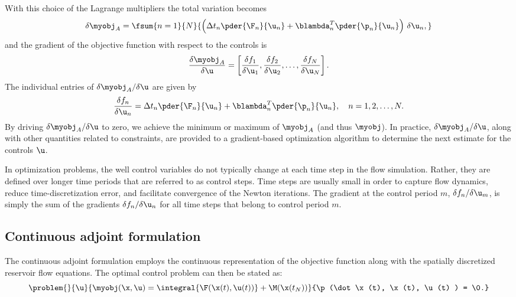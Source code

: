 %
With this choice of the Lagrange multipliers the total variation becomes
\begin{align*}
  \delta \myobj_A =
    \fsum{n=1}{N}{
      \left (
        \Delta t_n \pder{\F_n}{\u_n}
      +\blambda^T_n\pder{\p_n}{\u_n}
      \right ) \, \delta \u_n ,
    }
\end{align*}
and the gradient of the objective function with respect to the controls is
\begin{align}
\label{eq:optimizerDiscreteGradient}
  \frac{\delta \myobj_A}{\delta \u} = \left [
  \frac{\delta f_1}{\delta \u_1}, \frac{\delta f_2}{\delta \u_2},
  \ldots,
  \frac{\delta f_N}{\delta \u_N} \right ].
\end{align}
The individual entries of $\delta \myobj_A/\delta \u$ are given by
\begin{align}
\label{eq:discreteGradient}
  \frac{\delta f_n}{\delta \u_n} =
  \Delta t_n  \pder{\F_n}{\u_n}
  +\blambda^T_n\pder{\p_n}{\u_n}, \quad n=1,2,\ldots,N.
\end{align}
%
By driving $\delta \myobj_A / \delta \u$ to zero, we achieve the minimum or 
maximum of $\myobj_A$ (and thus $\myobj$). In practice, $\delta \myobj_A / \delta \u$, 
along with other quantities related to constraints, are provided to a 
gradient-based optimization algorithm to determine the next estimate for the controls $\u$.

In optimization problems, the well control variables do not typically change at each time step in the flow simulation. Rather, they are defined over longer time periods that are referred to as control steps. Time steps are usually small in order to capture flow dynamics, reduce time-discretization error, and facilitate convergence of the Newton iterations. 
The gradient at the control period $m$, $\delta f_n/\delta \u_m$, is simply the sum of
the gradients $\delta f_n/\delta \u_n$ for all time steps that belong to control period $m$.


\subsection{Continuous adjoint formulation}
\label{section:continuousAdjoint}
The continuous adjoint formulation employs the continuous
representation of the objective function along with the spatially discretized reservoir flow equations. The optimal control problem can then be stated as:
\[
   \problem{}{\u}{\displaystyle \myobj(\x, \u) = \integral{ \F(\x(t), \u(t)) } + \M(\x(t_N))}
                 {\p(\dot\x(t), \x(t), \u(t) ) = \0.}
\]



